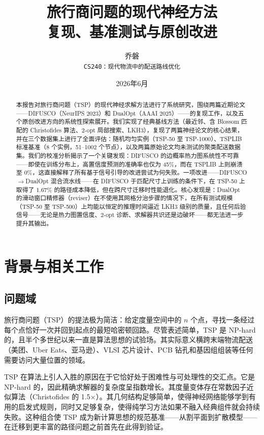 \documentclass[11pt,a4paper]{ctexart}
\title{\vspace{-1.5cm}旅行商问题的现代神经方法\\
\large 复现、基准测试与原创改进}
\author{乔磐\\
\texttt{CS240：现代物流中的配送路线优化}}
\date{2026年6月}
\begin{document}
\maketitle

\begin{abstract}
本报告对旅行商问题（TSP）的现代神经求解方法进行了系统研究，围绕两篇近期论文——DIFUSCO（NeurIPS 2023）和 DualOpt（AAAI 2025）——的复现工作，以及五个原创改进方向的系统性探索展开。我们实现了经典基线方法（最近邻、含 Blossom 匹配的 Christofides 算法、2-opt 局部搜索、LKH3），复现了两篇神经论文的核心结果，并在三个数据集上进行了全面评估：随机均匀实例（TSP-50 至 TSP-1000）、TSPLIB 标准基准（8 个实例，51--1002 个节点），以及两篇原始论文均未测试的聚类配送数据集。我们的校准分析揭示了一个关键发现：DIFUSCO 的边概率热力图系统性不可靠——即使在训练分布上，高置信度预测的准确率也仅为 45\%，而在 TSPLIB 上则崩溃至 0\%，这直接解释了所有基于信号引导的改进尝试为何失败。一项改进——DIFUSCO$\rightarrow$DualOpt 混合流水线——在 DIFUSCO 于匹配尺寸上训练的条件下，在 TSP-50 上取得了 1.67\% 的路径成本降低，但在跨尺寸迁移时性能退化。核心发现是：DualOpt 的滑动窗口精修器（reviser）在不使用其网格分治步骤的情况下，在所有测试规模（TSP-50 至 TSP-500）上均能以恒定的推理时间逼近 LKH3 级别的质量，且任何后验信号——无论是热力图置信度、2-opt 诊断、求解器共识还是边破坏——都无法进一步提升其输出。
\end{abstract}

\section{背景与相关工作}

\subsection{问题域}

旅行商问题（TSP）的提法极为简洁：给定度量空间中的 $n$ 个点，寻找一条经过每个点恰好一次并回到起点的最短哈密顿回路。尽管表述简单，TSP 是 NP-hard 的，且半个多世纪以来一直是算法思想的试验场。其实际意义横跨末端物流配送（美团、Uber Eats、亚马逊）、VLSI 芯片设计、PCB 钻孔和基因组组装等任何需要访问大量位置的领域。

TSP 在算法上引人入胜的原因在于它恰好处于困难性与可处理性的交汇点。它是 NP-hard 的，因此精确求解器的复杂度呈指数增长。其度量变体存在常数因子近似算法（Christofides 的 1.5$\times$）。其几何结构足够简单，使得神经网络能够学到有用的启发式规则，同时又足够复杂，使得纯学习方法如果不融入经典组件就会持续失败。这种组合使 TSP 成为新计算思想的规范基准——从割平面到扩散模型——在迁移到更丰富的路径问题之前首先在此得到验证。
\end{document}
